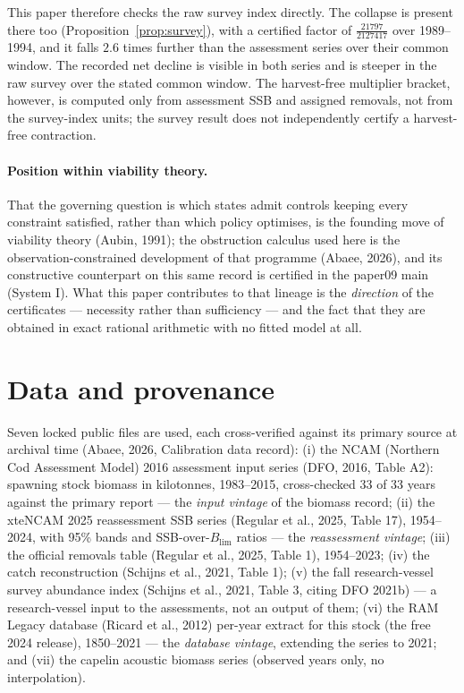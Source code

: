 \documentclass[10pt,twocolumn]{article}
\theoremstyle{plain}
\theoremstyle{remark}
\begin{document}
This paper therefore checks the raw survey index directly. The collapse is present there too
(Proposition~\ref{prop:survey}), with a certified factor of $\tfrac{21797}{2127417}$ over
1989--1994, and it falls $2.6$ times further than the assessment series over their common
window. The recorded net decline is visible in both series and is steeper in the raw survey
over the stated common window. The harvest-free multiplier bracket, however, is computed
only from assessment SSB and assigned removals, not from the survey-index units; the
survey result does not independently certify a harvest-free contraction.

\paragraph{Position within viability theory.} That the governing question is which states
admit controls keeping every constraint satisfied, rather than which policy optimises, is the
founding move of viability theory (Aubin, 1991); the obstruction calculus used here is the
observation-constrained development of that programme (Abaee, 2026), and its constructive
counterpart on this same record is certified in the paper09 main (System I). What this paper
contributes to that lineage is the \emph{direction} of the certificates --- necessity rather
than sufficiency --- and the fact that they are obtained in exact rational arithmetic with no
fitted model at all.

\section{Data and provenance}\label{data}

Seven locked public files are used, each cross-verified against its
primary source at archival time (Abaee, 2026, Calibration data record): (i) the NCAM (Northern Cod Assessment Model) 2016
assessment input series (DFO, 2016, Table A2): spawning stock biomass
in kilotonnes, 1983--2015, cross-checked 33 of 33 years against the
primary report --- the \emph{input vintage} of the biomass record;
(ii) the xteNCAM 2025 reassessment SSB series (Regular et al., 2025,
Table 17), 1954--2024, with 95\% bands and SSB-over-\(B_{\mathrm{lim}}\)
ratios --- the \emph{reassessment vintage}; (iii) the official
removals table (Regular et al., 2025, Table 1), 1954--2023; (iv) the
catch reconstruction (Schijns et al., 2021, Table 1); (v) the fall
research-vessel survey abundance index (Schijns et al., 2021, Table 3,
citing DFO 2021b) --- a research-vessel input to the assessments, not
an output of them; (vi) the RAM Legacy database (Ricard et al., 2012)
per-year extract for this stock (the free 2024 release), 1850--2021 --- the \emph{database
vintage}, extending the series to 2021; and (vii) the capelin acoustic
biomass series (observed years only, no interpolation).
\end{document}

